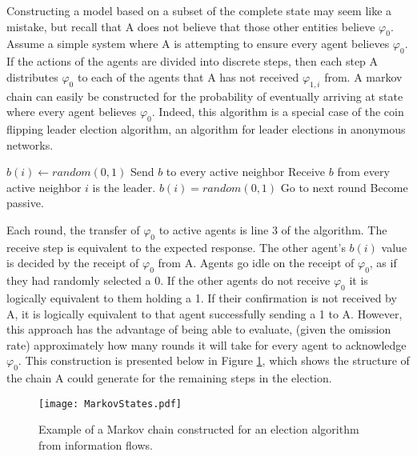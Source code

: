 Constructing a model based on a subset of the complete state may seem like a mistake, but recall that A does not believe that those other entities believe $\varphi_0$. Assume a simple system where A is attempting to ensure every agent believes $\varphi_0$. If the actions of the agents are divided into discrete steps, then each step A distributes $\varphi_0$ to each of the agents that A has not received $\varphi_{1,i}$ from. A markov chain can easily be constructed for the probability of eventually arriving at state where every agent believes $\varphi_0$. Indeed, this algorithm is a special case of the coin flipping leader election algorithm, an algorithm for leader elections in anonymous networks.

\begin{algorithmic}[1]
\small
\State $b(i) \gets random(0,1)$
\State Send $b$ to every active neighbor
\State Receive $b$ from every active neighbor
	\State $i$ is the leader.
		\State $b(i) = random(0,1)$
		\State Go to next round
		\State Become passive.
	\EndIf
\end{algorithmic}

Each round, the transfer of $\varphi_0$ to active agents is line 3 of the algorithm. The receive step is equivalent to the expected response. The other agent's $b(i)$ value is decided by the receipt of $\varphi_0$ from A. Agents go idle on the receipt of $\varphi_0$, as if they had randomly selected a 0. If the other agents do not receive $\varphi_0$ it is logically equivalent to them holding a 1. If their confirmation is not received by A, it is logically equivalent to that agent successfully sending a 1 to A. However, this approach has the advantage of being able to evaluate, (given the omission rate) approximately how many rounds it will take for every agent to acknowledge $\varphi_0$. This construction is presented below in Figure \ref{fig:markovstates}, which shows the structure of the chain A could generate for the remaining steps in the election.

\begin{figure}
\begin{centering}
\texttt{[image: MarkovStates.pdf]}
\caption{Example of a Markov chain constructed for an election algorithm from information flows.}
\label{fig:markovstates}
\end{centering}
\end{figure}

